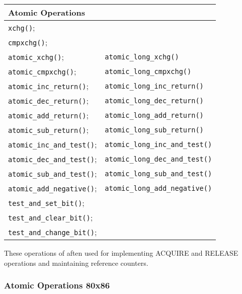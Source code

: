 \documentclass{article}
\begin{document}
\begin{center}
  \begin{tabular}{ l | l }    
    \hline
    Atomic Operations &  \\ \hline
    \lstinline{xchg()}; & \\
    \lstinline{cmpxchg()}; & \\
    \lstinline{atomic_xchg()}; &			\lstinline{atomic_long_xchg()} \\
    \lstinline{atomic_cmpxchg()}; &		        \lstinline{atomic_long_cmpxchg()} \\
    \lstinline{atomic_inc_return()}; &		        \lstinline{atomic_long_inc_return()} \\
    \lstinline{atomic_dec_return()}; &		        \lstinline{atomic_long_dec_return()} \\
    \lstinline{atomic_add_return()}; &		        \lstinline{atomic_long_add_return()} \\
    \lstinline{atomic_sub_return()}; &		        \lstinline{atomic_long_sub_return()} \\
    \lstinline{atomic_inc_and_test()}; &		\lstinline{atomic_long_inc_and_test()} \\
    \lstinline{atomic_dec_and_test()}; &		\lstinline{atomic_long_dec_and_test()} \\
    \lstinline{atomic_sub_and_test()}; &		\lstinline{atomic_long_sub_and_test()} \\
    \lstinline{atomic_add_negative()}; &		\lstinline{atomic_long_add_negative()} \\
    \lstinline{test_and_set_bit()}; & \\
    \lstinline{test_and_clear_bit()}; & \\
    \lstinline{test_and_change_bit()}; &     \\
    \hline
  \end{tabular}
\end{center}

These operations of aften used for implementing ACQUIRE and RELEASE
operations and maintaining reference counters.


\subsubsection{Atomic Operations 80x86}
\end{document}
